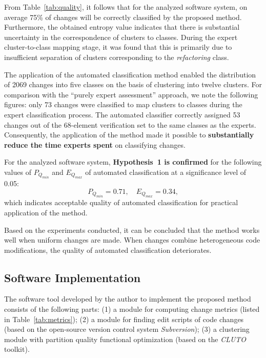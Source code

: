 \documentclass[11pt,a4paper]{article}
\begin{document}
From Table~\ref{tab:quality}, it follows that for the analyzed software system, on average 75\% of changes will be correctly classified by the proposed method. Furthermore, the obtained entropy value indicates that there is substantial uncertainty in the correspondence of clusters to classes. During the expert cluster-to-class mapping stage, it was found that this is primarily due to insufficient separation of clusters corresponding to the \textit{refactoring} class.

The application of the automated classification method enabled the distribution of 2069 changes into five classes on the basis of clustering into twelve clusters. For comparison with the ``purely expert assessment'' approach, we note the following figures: only 73 changes were classified to map clusters to classes during the expert classification process. The automated classifier correctly assigned 53 changes out of the 68-element verification set to the same classes as the experts. Consequently, the application of the method made it possible to \textbf{substantially reduce the time experts spent} on classifying changes.

For the analyzed software system, \textbf{Hypothesis~1 is confirmed} for the following values of $P_{Q_{min}}$ and $E_{Q_{max}}$ of automated classification at a significance level of 0.05:
\begin{equation}
    P_{Q_{min}} = 0.71, \quad E_{Q_{max}} = 0.34,
\end{equation}
which indicates acceptable quality of automated classification for practical application of the method.

Based on the experiments conducted, it can be concluded that the method works well when uniform changes are made. When changes combine heterogeneous code modifications, the quality of automated classification deteriorates.

\subsection{Software Implementation}

The software tool developed by the author to implement the proposed method consists of the following parts: (1) a module for computing change metrics (listed in Table~\ref{tab:metrics}); (2) a module for finding edit scripts of code changes (based on the open-source version control system \textit{Subversion}); (3) a clustering module with partition quality functional optimization (based on the \textit{CLUTO} toolkit).
\end{document}
